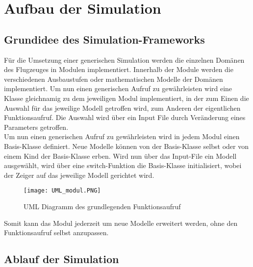 \chapter{Aufbau der Simulation}
\section{Grundidee des Simulation-Frameworks}
Für die Umsetzung einer generischen Simulation werden die einzelnen Domänen des Flugzeuges in Modulen implementiert. Innerhalb der Module werden die verschiedenen Ausbaustufen oder mathematischen Modelle der Domänen implementiert. Um nun einen generischen Aufruf zu gewährleisten wird eine Klasse gleichnamig zu dem jeweiligen Modul implementiert, in der zum Einen die Auswahl für das jeweilige Modell getroffen wird, zum Anderen der eigentlichen Funktionsaufruf. Die Auswahl wird über ein Input File durch Veränderung eines Parameters getroffen. \\
Um nun einen generischen Aufruf zu gewährleisten wird in jedem Modul einen Basis-Klasse definiert. Neue Modelle können von der Basis-Klasse selbst oder von einem Kind der Basis-Klasse erben. Wird nun über das Input-File ein Modell ausgewählt, wird über eine switch-Funktion die Basis-Klasse initialisiert, wobei der Zeiger auf das jeweilige Modell gerichtet wird. \\
\begin{figure}[h]
\centering\texttt{[image: UML\_modul.PNG]}	
\caption{UML Diagramm des grundlegenden Funktionsaufruf}
\label{fig:UML_modul}
\end{figure}

Somit kann das Modul jederzeit um neue Modelle erweitert werden, ohne den Funktionsaufruf selbst anzupassen.  
\section{Ablauf der Simulation}
